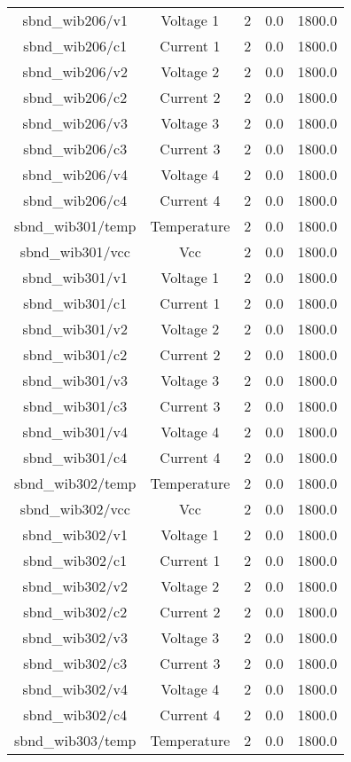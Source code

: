 \begin{center}
\begin{longtable}{c | c c c c }
sbnd\_wib206/v1 & Voltage 1 & 2 & 0.0 & 1800.0\\ 
sbnd\_wib206/c1 & Current 1 & 2 & 0.0 & 1800.0\\ 
sbnd\_wib206/v2 & Voltage 2 & 2 & 0.0 & 1800.0\\ 
sbnd\_wib206/c2 & Current 2 & 2 & 0.0 & 1800.0\\ 
sbnd\_wib206/v3 & Voltage 3 & 2 & 0.0 & 1800.0\\ 
sbnd\_wib206/c3 & Current 3 & 2 & 0.0 & 1800.0\\ 
sbnd\_wib206/v4 & Voltage 4 & 2 & 0.0 & 1800.0\\ 
sbnd\_wib206/c4 & Current 4 & 2 & 0.0 & 1800.0\\ 
sbnd\_wib301/temp & Temperature & 2 & 0.0 & 1800.0\\ 
sbnd\_wib301/vcc & Vcc & 2 & 0.0 & 1800.0\\ 
sbnd\_wib301/v1 & Voltage 1 & 2 & 0.0 & 1800.0\\ 
sbnd\_wib301/c1 & Current 1 & 2 & 0.0 & 1800.0\\ 
sbnd\_wib301/v2 & Voltage 2 & 2 & 0.0 & 1800.0\\ 
sbnd\_wib301/c2 & Current 2 & 2 & 0.0 & 1800.0\\ 
sbnd\_wib301/v3 & Voltage 3 & 2 & 0.0 & 1800.0\\ 
sbnd\_wib301/c3 & Current 3 & 2 & 0.0 & 1800.0\\ 
sbnd\_wib301/v4 & Voltage 4 & 2 & 0.0 & 1800.0\\ 
sbnd\_wib301/c4 & Current 4 & 2 & 0.0 & 1800.0\\ 
sbnd\_wib302/temp & Temperature & 2 & 0.0 & 1800.0\\ 
sbnd\_wib302/vcc & Vcc & 2 & 0.0 & 1800.0\\ 
sbnd\_wib302/v1 & Voltage 1 & 2 & 0.0 & 1800.0\\ 
sbnd\_wib302/c1 & Current 1 & 2 & 0.0 & 1800.0\\ 
sbnd\_wib302/v2 & Voltage 2 & 2 & 0.0 & 1800.0\\ 
sbnd\_wib302/c2 & Current 2 & 2 & 0.0 & 1800.0\\ 
sbnd\_wib302/v3 & Voltage 3 & 2 & 0.0 & 1800.0\\ 
sbnd\_wib302/c3 & Current 3 & 2 & 0.0 & 1800.0\\ 
sbnd\_wib302/v4 & Voltage 4 & 2 & 0.0 & 1800.0\\ 
sbnd\_wib302/c4 & Current 4 & 2 & 0.0 & 1800.0\\ 
sbnd\_wib303/temp & Temperature & 2 & 0.0 & 1800.0\\ 

\end{longtable}
\end{center}

